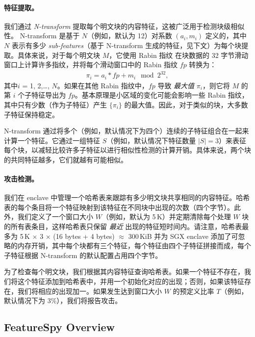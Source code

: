 \paragraph{特征提取。}
我们通过 {\em N-transform} \cite{shilane12} 提取每个明文块的内容特征，这被广泛用于检测块级相似性。 N-transform 是基于 $N$（例如，默认为 12）对系数 $(a_i, m_i)$ 定义的，其中 $N$ 表示有多少 {\em sub-features}（基于 N-transform 生成的特征，见下文）为每个块提取。具体来说，对于每个明文块 $M$，它使用 Rabin 指纹 \cite{rabin81} 在块数据的 32 字节滑动窗口上计算许多指纹，并将每个滑动窗口中的 Rabin 指纹 $fp$ 转换为：
\begin{eqnarray}
  \label{eq:feature}
  \pi_i = a_i * fp + m_i \mod 2^{32},
\end{eqnarray}
其中$i$ = 1, 2,\ldots, $N$。如果在其他 Rabin 指纹中，$fp$ 导致 {\em 最大值} $\pi_i$，则它将 $M$ 的第 $i$ 个子特征导出为 $fp$。基本原理是小区域的变化可能会影响一些 Rabin 指纹，其中只有少数（作为子特征）产生 $\{\pi_i\}$ 的最大值。因此，对于类似的块，大多数子特征保持稳定。

N-transform 通过将多个（例如，默认情况下为四个）连续的子特征组合在一起来计算一个特征。它通过一组特征 $S$（例如，默认情况下特征数量 $|S| = 3$）来表征每个块，以减轻比较许多子特征以进行相似性检测的计算开销。具体来说，两个块的共同特征越多，它们就越有可能相似。


\paragraph{攻击检测。}
我们在 enclave 中管理一个哈希表来跟踪有多少明文块共享相同的内容特征。哈希表的每个条目将一个特征映射到该特征在不同块中出现的次数（四个字节）。此外，我们定义了一个窗口大小 $W$（例如，默认为 5\,K）并定期清除每个处理 $W$ 块的所有表条目，这样哈希表只保留 {\em 最近} 出现的特征短时间内。请注意，哈希表最多为 5\,K $\times$ 3 $\times$ (16 bytes + 4 bytes) $\approx$ 300\,KiB 并为 SGX enclave 添加了可忽略的内存开销，其中每个块都有三个特征，每个特征由四个子特征拼接而成，每个子特征根据 N-transform 的默认配置占用四个字节。

为了检查每个明文块，我们根据其内容特征查询哈希表。如果一个特征不存在，我们将这个特征添加到哈希表中，并用一个初始化对应的出现；否则，如果该特征存在，我们将相应的出现加一。如果发生达到窗口大小 $W$ 的预定义比率 $T$（例如，默认情况下为 3\%），我们将报告攻击。



\subsection{FeatureSpy Overview}
\label{sub:secure_design}

